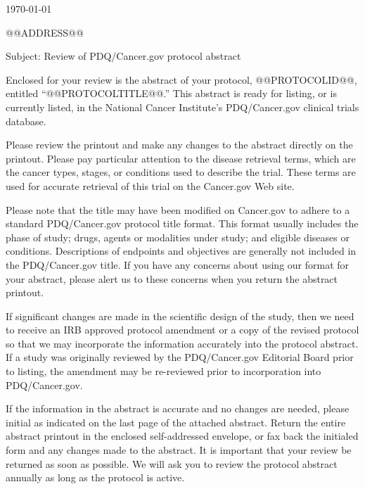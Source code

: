 \documentclass[letterpaper,12pt]{letter}
\begin{document}
\thispagestyle{empty}

\LetterheadWithLogo
  
\vspace{36pt}

\today

@@ADDRESS@@

\vspace{12pt}

Subject: Review of PDQ/Cancer.gov protocol abstract

Enclosed for your review is the abstract of your protocol, @@PROTOCOLID@@,
entitled ``@@PROTOCOLTITLE@@.''  This abstract is ready for listing, or is
currently listed, in the National Cancer Institute's PDQ/Cancer.gov
clinical trials database.

Please review the printout and make any changes to the abstract directly on
the printout.  Please pay particular attention to the disease retrieval terms,
which are the cancer types, stages, or conditions used to describe the
trial.  These terms are used for accurate retrieval of this trial on the
Cancer.gov Web site.

Please note that the title may have been modified on Cancer.gov to adhere to a
standard PDQ/Cancer.gov protocol title format.  This format usually includes
the phase of study; drugs, agents or modalities under study; and eligible
diseases or conditions.  Descriptions of endpoints and objectives are
generally not included in the PDQ/Cancer.gov title.  If you have any concerns
about using our format for your abstract, please alert us to these concerns
when you return the abstract printout.

If significant changes are made in the scientific design of the study, then we
need to receive an IRB approved protocol amendment or a copy of the revised
protocol so that we may incorporate the information accurately into the
protocol abstract.  If a study was originally reviewed by the PDQ/Cancer.gov
Editorial Board prior to listing, the amendment may be re-reviewed prior to
incorporation into PDQ/Cancer.gov.

If the information in the abstract is accurate and no changes are needed,
please initial as indicated on the last page of the attached abstract.  Return
the entire abstract printout in the enclosed self-addressed envelope, or fax
back the initialed form and any changes made to the abstract.  It is important
that your review be returned as soon as possible.  We will ask you to review
the protocol abstract annually as long as the protocol is active.
\end{document}

